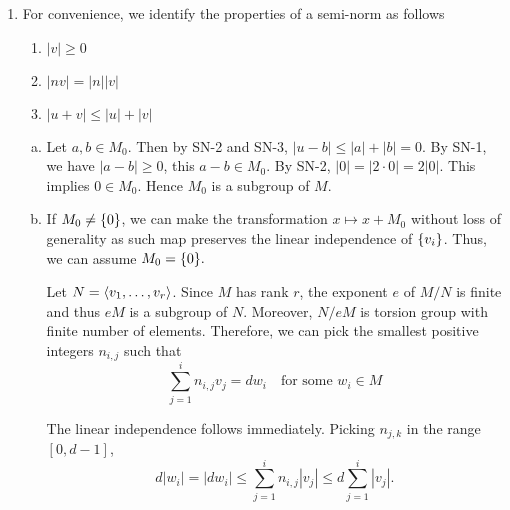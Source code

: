 \documentclass{article}
\theoremstyle{definition}
\theoremstyle{remark}
\begin{document}
\begin{enumerate}[(1)]
  \item
        For convenience, we identify the properties of a semi-norm as follows
        \begin{enumerate}[SN-1]
          \item $|v| \geq 0$ \label{sn1}
          \item $|nv| = |n||v|$ \label{sn2}
          \item $|u + v| \leq |u| + |v|$ \label{sn3}
        \end{enumerate}


        \begin{enumerate}[(a)]
          \item Let $a, b \in M_0$.  Then by SN-2 and SN-3, $|u - b| \leq |a| + |b| = 0$. By SN-1, we have $|a - b| \geq 0$, this $a - b \in M_0$. By SN-2, $|0| = |2 \cdot 0| = 2|0|.$ This implies $0 \in M_0.$ Hence $M_0$ is a subgroup of $M$.

          \item If $M_0 \neq \{0\}$,  we can make the transformation $x \mapsto x + M_0$ without loss of generality as such map preserves the linear independence of $\{v_i\}$. Thus, we can assume $M_0 = \{0\}.$

          Let $N = \langle v_1, \dots, v_r \rangle$. Since $M$ has rank $r$, the exponent $e$ of $M/N$ is finite and thus $eM$ is a subgroup of $N$. Moreover, $N/eM$ is torsion group with finite number of elements. Therefore, we can pick the smallest positive integers $n_{i, j}$ such that
                $$\sum_{j = 1}^i n_{i, j}v_j = dw_i \quad \text{for some }  w_i \in M$$

                The linear independence follows immediately. Picking $n_{j, k}$ in the range $[0, d - 1]$,
                $$d |w_i| = |dw_i| \leq \sum_{j = 1}^i n_{i, j}|v_j| \leq d\sum_{j = 1}^i |v_j| .$$
        \end{enumerate}


\end{enumerate}
\end{document}
